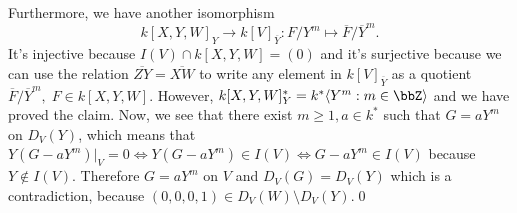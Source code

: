 Furthermore, we have another isomorphism
\begin{equation}
    k[X,Y,W]_Y\rightarrow k[V]_{\overline{Y}}: F/Y^m\mapsto \overline{F}/\overline{Y}^m.
\end{equation}
It's injective because $I(V)\cap k[X,Y,W]=(0)$ and it's surjective because we can use the relation 
$\overline{ZY}=\overline{XW}$ to write any element in $k[V]_{\overline{Y}}$ as a quotient 
$\overline{F}/\overline{Y}^m,\;F\in k[X,Y,W]$. However, $k[X,Y,W]_Y^*=k^*\langle Y^m:m\in\bbZ\rangle$ and we have proved the claim. 
Now, we see that there exist $m\geq1, a\in k^*$ such that $G=aY^m$ on $D_V(Y)$, which means that 
$Y(G-aY^m)|_V=0\iff Y(G-aY^m)\in I(V)\iff G-aY^m\in I(V)$ because $Y\notin I(V)$. Therefore $G=aY^m$ on $V$ and 
$D_V(G)=D_V(Y)$ which is a contradiction, because $(0,0,0,1)\in D_V(W)\setminus D_V(Y)$.\qed

